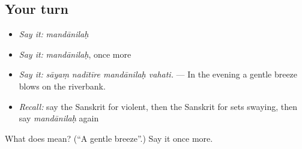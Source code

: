 \subsection*{Your turn}
\begin{itemize}
\raggedright
  \item \emph{Say it:} \emph{mandānilaḥ}
  \item \emph{Say it:} \emph{mandānilaḥ}, once more
  \item \emph{Say it:} \emph{sāyaṃ nadītīre mandānilaḥ vahati.} — In the evening a gentle breeze blows on the riverbank.
  \item \emph{Recall:} say the Sanskrit for violent, then the Sanskrit for sets swaying, then say \emph{mandānilaḥ} again
\end{itemize}

\begin{tcolorbox}[breakable,colback=teal!4,colframe=teal!35!black,title={Before you move on}]
What does  mean? (\textquotedblleft{}A gentle breeze\textquotedblright{}.) Say it once more.
\end{tcolorbox}
